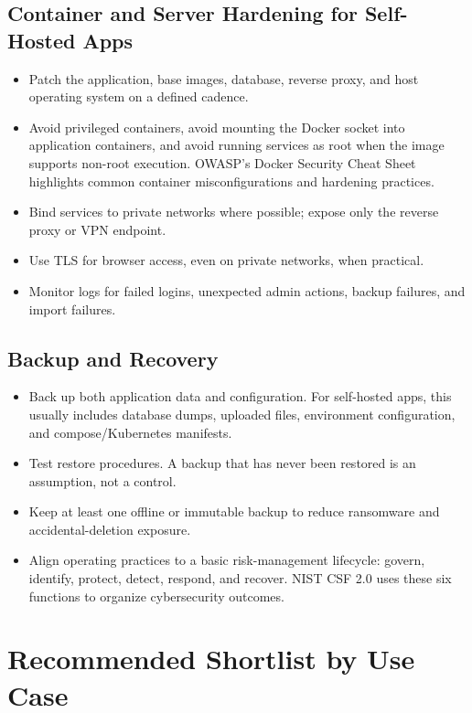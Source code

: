 \documentclass[11pt]{article}
\begin{document}
\subsection{Container and Server Hardening for Self-Hosted Apps}

\begin{itemize}
  \item Patch the application, base images, database, reverse proxy, and host operating system on a defined cadence.
  \item Avoid privileged containers, avoid mounting the Docker socket into application containers, and avoid running services as root when the image supports non-root execution. OWASP's Docker Security Cheat Sheet highlights common container misconfigurations and hardening practices.\cite{owasp-docker}
  \item Bind services to private networks where possible; expose only the reverse proxy or VPN endpoint.
  \item Use TLS for browser access, even on private networks, when practical.
  \item Monitor logs for failed logins, unexpected admin actions, backup failures, and import failures.
\end{itemize}

\subsection{Backup and Recovery}

\begin{itemize}
  \item Back up both application data and configuration. For self-hosted apps, this usually includes database dumps, uploaded files, environment configuration, and compose/Kubernetes manifests.
  \item Test restore procedures. A backup that has never been restored is an assumption, not a control.
  \item Keep at least one offline or immutable backup to reduce ransomware and accidental-deletion exposure.
  \item Align operating practices to a basic risk-management lifecycle: govern, identify, protect, detect, respond, and recover. NIST CSF 2.0 uses these six functions to organize cybersecurity outcomes.\cite{nist-csf}
\end{itemize}

\section{Recommended Shortlist by Use Case}
\end{document}
